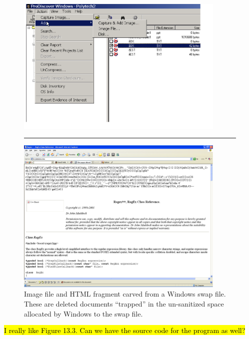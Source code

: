 \begin{figure}[ht]
\center
\includegraphics[width=100mm]{ch-carving/imageinswap.png}
\vspace{3mm}
\noindent\rule{60mm}{1pt}
\vspace{3mm}
\includegraphics[width=100mm]{ch-carving/cacheinswap.png}
\caption{Image file and HTML fragment carved from a Windows swap file.  These are deleted documents ``trapped'' in the un-sanitized space allocated by Windows to the swap file.}
\label{fig:insideswapfileå}
\end{figure}


\hl{I really like Figure 13.3. Can we have the source code for the
  program as well?}


